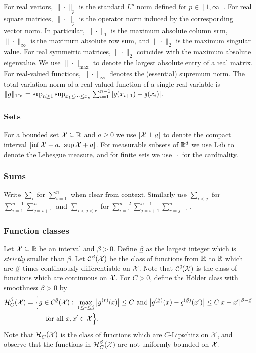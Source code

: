 For real vectors,
$\|\cdot\|_p$ is the standard $L^p$
norm defined for $p \in [1, \infty]$.
For real square matrices,
$\|\cdot\|_p$ is the operator
norm induced by the corresponding vector norm.
In particular,
$\|\cdot\|_1$
is the maximum absolute column sum,
$\|\cdot\|_\infty$
is the maximum absolute row sum,
and
$\|\cdot\|_2$
is the maximum singular value.
For real symmetric matrices,
$\|\cdot\|_2$
coincides with the maximum absolute eigenvalue.
We use $\|\cdot\|_{\max}$
to denote the largest absolute entry of a real matrix.
For real-valued functions,
$\|\cdot\|_\infty$
denotes the (essential) supremum norm.
The total variation norm of a
real-valued function of a single real variable is
$\|g\|_{\mathrm{TV}} = \sup_{n \geq 1} \sup_{x_1 \leq \cdots \leq x_n}
\sum_{i=1}^{n-1} |g(x_{i+1}) - g(x_i)|$.

\subsubsection{Sets}

For a bounded set $\mathcal{X} \subseteq \mathbb{R}$ and $a \geq 0$
we use $[\mathcal{X} \pm a]$ to denote the compact interval
$[\inf \mathcal{X} - a, \ \sup \mathcal{X} + a]$.
For measurable subsets of $\mathbb{R}^d$
we use $\operatorname{Leb}$ to denote the Lebesgue measure,
and for finite sets we use $|\cdot|$
for the cardinality.

\subsubsection{Sums}

Write $\sum_i$
for $\sum_{i=1}^n$
when clear from context.
Similarly use $\sum_{i<j}$
for $\sum_{i=1}^{n-1} \sum_{j=i+1}^n$
and $\sum_{i<j<r}$
for $\sum_{i=1}^{n-2} \sum_{j=i+1}^{n-1} \sum_{r=j+1}^n$.

\subsubsection{Function classes}

Let $\mathcal{X} \subseteq \mathbb{R}$ be an interval and $\beta > 0$.
Define $\flbeta$ as the largest integer
which is \emph{strictly} smaller than $\beta$.
Let $\cC^{\flbeta}(\cX)$ be the class
of functions from $\mathbb{R}$ to $\mathbb{R}$ which are
$\flbeta$ times continuously differentiable on $\mathcal{X}$.
Note that $\mathcal{C}^0(\mathcal{X})$ is the class of functions
which are continuous on $\mathcal{X}$.
For $C > 0$, define the H{\"o}lder class with smoothness
$\beta > 0$ by
%
\begin{align*}
  \cH^\beta_C(\cX)
  &=
  \Big\{
    g \in \cC^{\flbeta}(\cX): \
    \max_{1 \leq r \leq \flbeta}
    \big| g^{(r)}(x) \big| \leq C
    \text{ and }
    \big| g^{(\flbeta)}(x) - g^{(\flbeta)}(x') \big|
    \leq C |x-x'|^{\beta - \flbeta} \\
    &\quad\qquad\text{for all }
    x, x' \in \cX
  \Big\}.
\end{align*}
%
Note that $\mathcal{H}^1_C(\mathcal{X})$
is the class of functions which are $C$-Lipschitz on $\mathcal{X}$,
and observe that the functions in
$\mathcal{H}^\beta_C(\mathcal{X})$ are not uniformly bounded on $\mathcal{X}$.


